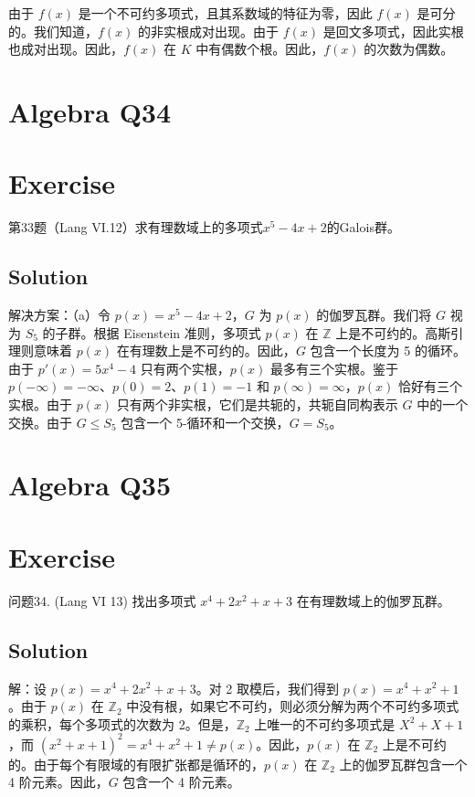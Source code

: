 \documentclass[12pt]{book}
\begin{document}
由于 $f(x)$ 是一个不可约多项式，且其系数域的特征为零，因此 $f(x)$ 是可分的。我们知道，$f(x)$ 的非实根成对出现。由于 $f(x)$ 是回文多项式，因此实根也成对出现。因此，$f(x)$ 在 $K$ 中有偶数个根。因此，$f(x)$ 的次数为偶数。
\newpage
\section{Algebra Q34}
\section*{Exercise}
第33题（Lang VI.12）求有理数域上的多项式$x^5 - 4x + 2$的Galois群。



\subsection*{Solution}
解决方案：（a）令 $p(x) = x^5 - 4x + 2$，$G$ 为 $p(x)$ 的伽罗瓦群。我们将 $G$ 视为 $S_5$ 的子群。根据 Eisenstein 准则，多项式 $p(x)$ 在 $\mathbb{Z}$ 上是不可约的。高斯引理则意味着 $p(x)$ 在有理数上是不可约的。因此，$G$ 包含一个长度为 5 的循环。由于 $p'(x) = 5x^4 - 4$ 只有两个实根，$p(x)$ 最多有三个实根。鉴于 $p(-\infty) = -\infty$、$p(0) = 2$、$p(1) = -1$ 和 $p(\infty) = \infty$，$p(x)$ 恰好有三个实根。由于 $p(x)$ 只有两个非实根，它们是共轭的，共轭自同构表示 $G$ 中的一个交换。由于 $G \le S_5$ 包含一个 5-循环和一个交换，$G = S_5$。
\newpage
\section{Algebra Q35}
\section*{Exercise}
问题34. (Lang VI 13) 找出多项式 $x^4 + 2x^2 + x + 3$ 在有理数域上的伽罗瓦群。



\subsection*{Solution}
解：设 $p(x) = x^4 + 2x^2 + x + 3$。对 2 取模后，我们得到 $p(x) = x^4 + x^2 + 1$。由于 $p(x)$ 在 $\mathbb{Z}_2$ 中没有根，如果它不可约，则必须分解为两个不可约多项式的乘积，每个多项式的次数为 2。但是，$\mathbb{Z}_2$ 上唯一的不可约多项式是 $X^2 + X + 1$，而 $(x^2 + x + 1)^2 = x^4 + x^2 + 1 \neq p(x)$。因此，$p(x)$ 在 $\mathbb{Z}_2$ 上是不可约的。由于每个有限域的有限扩张都是循环的，$p(x)$ 在 $\mathbb{Z}_2$ 上的伽罗瓦群包含一个 4 阶元素。因此，$G$ 包含一个 4 阶元素。
\end{document}
